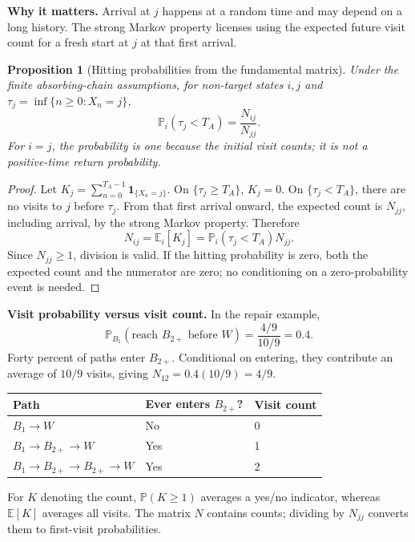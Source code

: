 \documentclass[11pt]{article}
\newtheorem{proposition}[definition]{Proposition}
\theoremstyle{remark}\newtheorem{remark}[definition]{Remark}
\newcommand{\E}{\mathbb E}\newcommand{\Prob}{\mathbb P}
\begin{document}
\textbf{Why it matters.} Arrival at $j$ happens at a random time and may depend on a long history. The strong Markov property licenses using the expected future visit count for a fresh start at $j$ at that first arrival.

\begin{proposition}[Hitting probabilities from the fundamental matrix]
Under the finite absorbing-chain assumptions, for non-target states $i,j$ and $\tau_j=\inf\{n\geq0:X_n=j\}$,
\[
\boxed{\Prob_i(\tau_j<T_A)=\frac{N_{ij}}{N_{jj}}.}
\]
For $i=j$, the probability is one because the initial visit counts; it is not a positive-time return probability.
\end{proposition}
\begin{proof}
Let $K_j=\sum_{n=0}^{T_A-1}\mathbf1_{\{X_n=j\}}$. On $\{\tau_j\geq T_A\}$, $K_j=0$. On $\{\tau_j<T_A\}$, there are no visits to $j$ before $\tau_j$. From that first arrival onward, the expected count is $N_{jj}$, including arrival, by the strong Markov property. Therefore
\[
N_{ij}=\E_i[K_j]=\Prob_i(\tau_j<T_A)N_{jj}.
\]
Since $N_{jj}\geq1$, division is valid. If the hitting probability is zero, both the expected count and the numerator are zero; no conditioning on a zero-probability event is needed.
\end{proof}

\textbf{Visit probability versus visit count.} In the repair example,
\[
\Prob_{B_1}(\text{reach }B_{2+}\text{ before }W)
=\frac{4/9}{10/9}=0.4.
\]
Forty percent of paths enter $B_{2+}$. Conditional on entering, they contribute an average of $10/9$ visits, giving $N_{12}=0.4(10/9)=4/9$.
\begin{center}\small
\begin{tabular}{@{}lll@{}}\toprule
Path & Ever enters $B_{2+}$? & Visit count\\\midrule
$B_1\to W$ & No & 0\\
$B_1\to B_{2+}\to W$ & Yes & 1\\
$B_1\to B_{2+}\to B_{2+}\to W$ & Yes & 2\\\bottomrule
\end{tabular}\end{center}
For $K$ denoting the count, $\Prob(K\geq1)$ averages a yes/no indicator, whereas $\E[K]$ averages all visits. The matrix $N$ contains counts; dividing by $N_{jj}$ converts them to first-visit probabilities.

\clearpage
\end{document}
